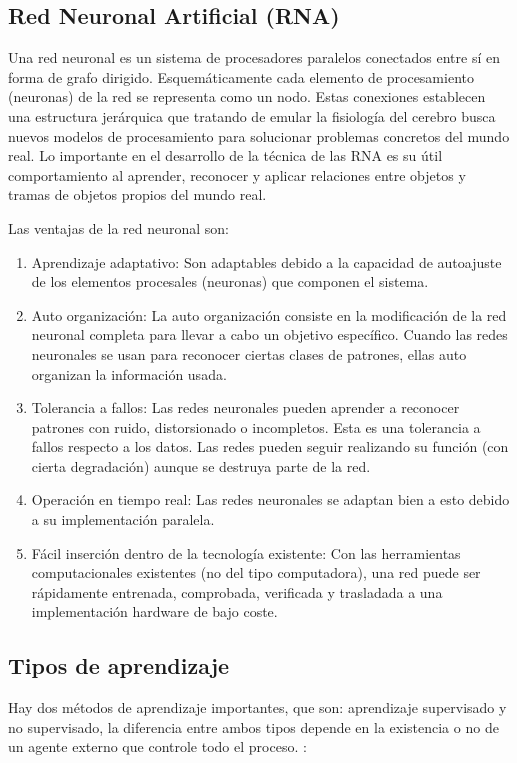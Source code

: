 \subsection{Red Neuronal Artificial (RNA)}
Una red neuronal es un sistema de procesadores paralelos conectados entre sí en forma de grafo dirigido. Esquemáticamente cada elemento de procesamiento (neuronas) de la red se
representa como un nodo. Estas conexiones
establecen una estructura jerárquica que tratando de
emular la fisiología del cerebro busca nuevos
modelos de procesamiento para solucionar
problemas concretos del mundo real. Lo importante
en el desarrollo de la técnica de las RNA es su útil
comportamiento al aprender, reconocer y aplicar
relaciones entre objetos y tramas de objetos propios
del mundo real. \citep{freeman1991neural}

Las ventajas de la red neuronal son:
\begin{enumerate}
\item Aprendizaje adaptativo: Son adaptables debido a la capacidad de autoajuste de los elementos procesales (neuronas) que componen el sistema.
\item Auto organización: La auto organización consiste en la modificación de la red neuronal completa para llevar a cabo un objetivo específico. Cuando las redes neuronales se usan para reconocer ciertas clases de patrones, ellas auto organizan la información usada.
\item Tolerancia a fallos: Las redes neuronales pueden aprender a reconocer patrones con ruido, distorsionado o incompletos. Esta es una tolerancia a fallos respecto a los datos. Las redes pueden seguir realizando su función (con cierta degradación) aunque se destruya parte de la red.
\item Operación en tiempo real: Las redes neuronales se adaptan bien a esto debido a su implementación paralela.
\item Fácil inserción dentro de la tecnología existente: Con las herramientas computacionales existentes (no del tipo computadora), una red puede ser rápidamente entrenada, comprobada, verificada y trasladada a una implementación hardware de bajo coste.
\end{enumerate}

\subsection{Tipos de aprendizaje}
Hay dos métodos de aprendizaje importantes, que son: aprendizaje supervisado y no supervisado, la diferencia entre ambos tipos depende en la existencia o no de un agente externo que controle todo el proceso. \citep{matich2001redes}:

